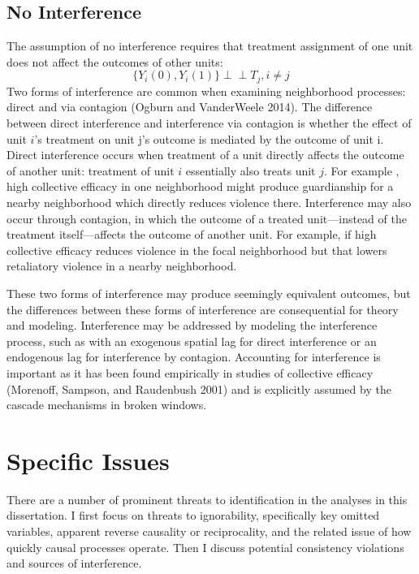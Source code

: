 \documentclass [11pt, proquest] {uwthesis}[2015/03/03]
\begin{document}
\hypertarget{no-interference}{%
\subsection{No Interference}\label{no-interference}}

The assumption of no interference requires that treatment assignment of one unit does not affect the outcomes of other units:
\begin{equation}
\{Y_i(0), Y_i(1)\} \perp\!\!\!\perp T_j, i \neq j
\end{equation}
Two forms of interference are common when examining neighborhood processes: direct and via contagion (Ogburn and VanderWeele 2014). The difference between direct interference and interference via contagion is whether the effect of unit \(i\)'s treatment on unit j's outcome is mediated by the outcome of unit i. Direct interference occurs when treatment of a unit directly affects the outcome of another unit: treatment of unit \(i\) essentially also treats unit \(j\). For example , high collective efficacy in one neighborhood might produce guardianship for a nearby neighborhood which directly reduces violence there. Interference may also occur through contagion, in which the outcome of a treated unit---instead of the treatment itself---affects the outcome of another unit. For example, if high collective efficacy reduces violence in the focal neighborhood but that lowers retaliatory violence in a nearby neighborhood.

These two forms of interference may produce seemingly equivalent outcomes, but the differences between these forms of interference are consequential for theory and modeling. Interference may be addressed by modeling the interference process, such as with an exogenous spatial lag for direct interference or an endogenous lag for interference by contagion. Accounting for interference is important as it has been found empirically in studies of collective efficacy (Morenoff, Sampson, and Raudenbush 2001) and is explicitly assumed by the cascade mechanisms in broken windows.

\hypertarget{specific-issues}{%
\section{Specific Issues}\label{specific-issues}}

There are a number of prominent threats to identification in the analyses in this dissertation. I first focus on threats to ignorability, specifically key omitted variables, apparent reverse causality or reciprocality, and the related issue of how quickly causal processes operate. Then I discuss potential consistency violations and sources of interference.
\end{document}
